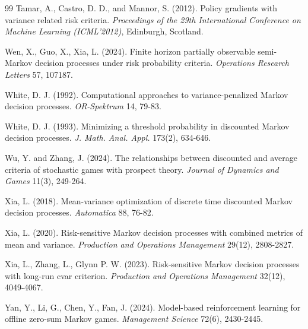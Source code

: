 \documentclass[12pt]{article}
\begin{document}
\begin{thebibliography}{99}
 Tamar, A., Castro, D. D., and Mannor, S. (2012). Policy gradients with variance related risk criteria. \emph{Proceedings of the 29th International Conference on Machine Learning (ICML'2012)}, Edinburgh, Scotland.

 Wen, X., Guo, X., Xia, L. (2024). Finite horizon partially observable semi-Markov decision processes under risk probability criteria. \emph{Operations Research Letters} 57, 107187.


 White, D. J. (1992). Computational approaches to variance-penalized Markov decision processes. \emph{OR-Spektrum} 14, 79-83.

 White, D. J. (1993). Minimizing a threshold probability in discounted Markov decision processes. \emph{J. Math. Anal. Appl.} 173(2), 634-646.

 Wu, Y. and Zhang, J. (2024). The relationships between discounted and average criteria of stochastic games with prospect theory. \emph{Journal of Dynamics and Games} 11(3), 249-264.

 Xia, L. (2018). Mean-variance optimization of discrete time discounted Markov decision processes. \emph{Automatica} 88, 76-82.

 Xia, L. (2020). Risk-sensitive Markov decision processes with combined metrics of mean and variance. \emph{Production and Operations Management} 29(12), 2808-2827.

 Xia, L., Zhang, L., Glynn P. W. (2023). Risk-sensitive Markov decision processes with long-run cvar criterion. \emph{Production and Operations Management} 32(12), 4049-4067.

 Yan, Y., Li, G., Chen, Y., Fan, J. (2024). Model-based reinforcement learning for offline zero-sum Markov games. \emph{Management Science} 72(6), 2430-2445.



\end{thebibliography}
\end{document}
